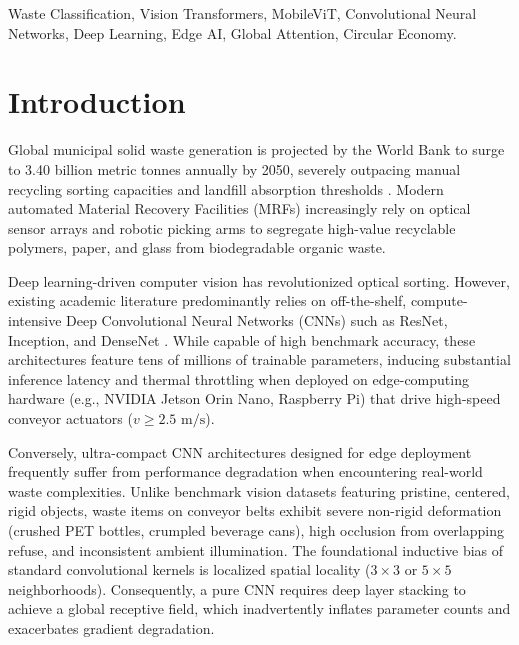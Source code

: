 \documentclass[conference]{IEEEtran}
\begin{document}
\begin{IEEEkeywords}
Waste Classification, Vision Transformers, MobileViT, Convolutional Neural Networks, Deep Learning, Edge AI, Global Attention, Circular Economy.
\end{IEEEkeywords}

\section{Introduction}
Global municipal solid waste generation is projected by the World Bank to surge to 3.40 billion metric tonnes annually by 2050, severely outpacing manual recycling sorting capacities and landfill absorption thresholds \cite{worldbank2018}. Modern automated Material Recovery Facilities (MRFs) increasingly rely on optical sensor arrays and robotic picking arms to segregate high-value recyclable polymers, paper, and glass from biodegradable organic waste. 

Deep learning-driven computer vision has revolutionized optical sorting. However, existing academic literature predominantly relies on off-the-shelf, compute-intensive Deep Convolutional Neural Networks (CNNs) such as ResNet, Inception, and DenseNet \cite{islam2025eccdn}. While capable of high benchmark accuracy, these architectures feature tens of millions of trainable parameters, inducing substantial inference latency and thermal throttling when deployed on edge-computing hardware (e.g., NVIDIA Jetson Orin Nano, Raspberry Pi) that drive high-speed conveyor actuators ($v \ge 2.5\text{ m/s}$).

Conversely, ultra-compact CNN architectures designed for edge deployment frequently suffer from performance degradation when encountering real-world waste complexities. Unlike benchmark vision datasets featuring pristine, centered, rigid objects, waste items on conveyor belts exhibit severe non-rigid deformation (crushed PET bottles, crumpled beverage cans), high occlusion from overlapping refuse, and inconsistent ambient illumination. The foundational inductive bias of standard convolutional kernels is localized spatial locality ($3 \times 3$ or $5 \times 5$ neighborhoods). Consequently, a pure CNN requires deep layer stacking to achieve a global receptive field, which inadvertently inflates parameter counts and exacerbates gradient degradation.
\end{document}
